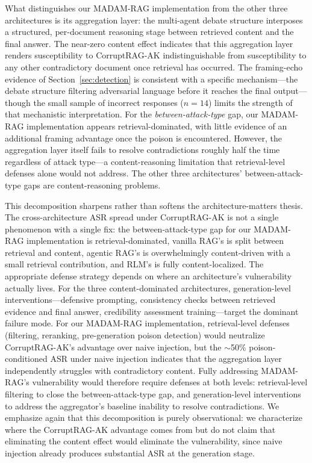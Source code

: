 \documentclass[11pt]{article}
\begin{document}
What distinguishes our MADAM-RAG implementation from the other three architectures is its aggregation layer: the multi-agent debate structure interposes a structured, per-document reasoning stage between retrieved content and the final answer. The near-zero content effect indicates that this aggregation layer renders susceptibility to CorruptRAG-AK indistinguishable from susceptibility to any other contradictory document once retrieval has occurred. The framing-echo evidence of Section~\ref{sec:detection} is consistent with a specific mechanism---the debate structure filtering adversarial language before it reaches the final output---though the small sample of incorrect responses ($n{=}14$) limits the strength of that mechanistic interpretation. For the \emph{between-attack-type} gap, our MADAM-RAG implementation appears retrieval-dominated, with little evidence of an additional framing advantage once the poison is encountered. However, the aggregation layer itself fails to resolve contradictions roughly half the time regardless of attack type---a content-reasoning limitation that retrieval-level defenses alone would not address. The other three architectures' between-attack-type gaps are content-reasoning problems.

This decomposition sharpens rather than softens the architecture-matters thesis. The cross-architecture ASR spread under CorruptRAG-AK is not a single phenomenon with a single fix: the between-attack-type gap for our MADAM-RAG implementation is retrieval-dominated, vanilla RAG's is split between retrieval and content, agentic RAG's is overwhelmingly content-driven with a small retrieval contribution, and RLM's is fully content-localized. The appropriate defense strategy depends on where an architecture's vulnerability actually lives. For the three content-dominated architectures, generation-level interventions---defensive prompting, consistency checks between retrieved evidence and final answer, credibility assessment training---target the dominant failure mode. For our MADAM-RAG implementation, retrieval-level defenses (filtering, reranking, pre-generation poison detection) would neutralize CorruptRAG-AK's advantage over naive injection, but the ${\sim}$50\% poison-conditioned ASR under naive injection indicates that the aggregation layer independently struggles with contradictory content. Fully addressing MADAM-RAG's vulnerability would therefore require defenses at both levels: retrieval-level filtering to close the between-attack-type gap, and generation-level interventions to address the aggregator's baseline inability to resolve contradictions. We emphasize again that this decomposition is purely observational: we characterize where the CorruptRAG-AK advantage comes from but do not claim that eliminating the content effect would eliminate the vulnerability, since naive injection already produces substantial ASR at the generation stage.
\end{document}
